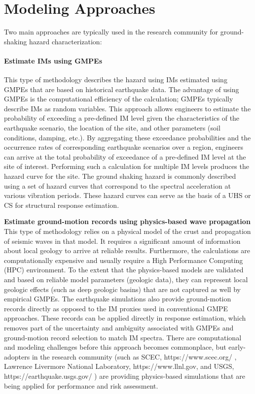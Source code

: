 \section{Modeling Approaches}
\label{sec:eq_shake_models}

Two main approaches are typically used in the research community for ground-shaking hazard characterization:

\paragraph{Estimate IMs using GMPEs} This type of methodology describes the hazard using IMs estimated using GMPEs that are based on historical earthquake data. The advantage of using GMPEs is the computational efficiency of the calculation; GMPEs typically describe IMs as random variables. This approach allows engineers to estimate the probability of exceeding a pre-defined IM level given the characteristics of the earthquake scenario, the location of the site, and other parameters (soil conditions, damping, etc.). By aggregating these exceedance probabilities and the occurrence rates of corresponding earthquake scenarios over a region, engineers can arrive at the total probability of exceedance of a pre-defined IM level at the site of interest. Performing such a calculation for multiple IM levels produces the hazard curve for the site. The ground shaking hazard is commonly described using a set of hazard curves that correspond to the spectral acceleration at various vibration periods. These hazard curves can serve as the basis of a UHS or CS for structural response estimation.
\newline

\noindent\textbf{Estimate ground-motion records using physics-based wave propagation} \\This type of methodology relies on a physical model of the crust and propagation of seismic waves in that model. It requires a significant amount of information about local geology to arrive at reliable results. Furthermore, the calculations are computationally expensive and usually require a High Performance Computing (HPC) environment. To the extent that the physics-based models are validated and based on reliable model parameters (geologic data), they can represent local geologic effects (such as deep geologic basins) that are not captured as well by empirical GMPEs. The earthquake simulations also provide ground-motion records directly as opposed to the IM proxies used in conventional GMPE approaches. These records can be applied directly in response estimation, which removes part of the uncertainty and ambiguity associated with GMPEs and ground-motion record selection to match IM spectra. There are computational and modeling challenges before this approach becomes commonplace, but early-adopters in the research community (such as SCEC, https://www.scec.org/ , Lawrence Livermore National Laboratory, https://www.llnl.gov, and USGS, https://earthquake.usgs.gov/ ) are providing physics-based simulations that are being applied for performance and risk assessment.

